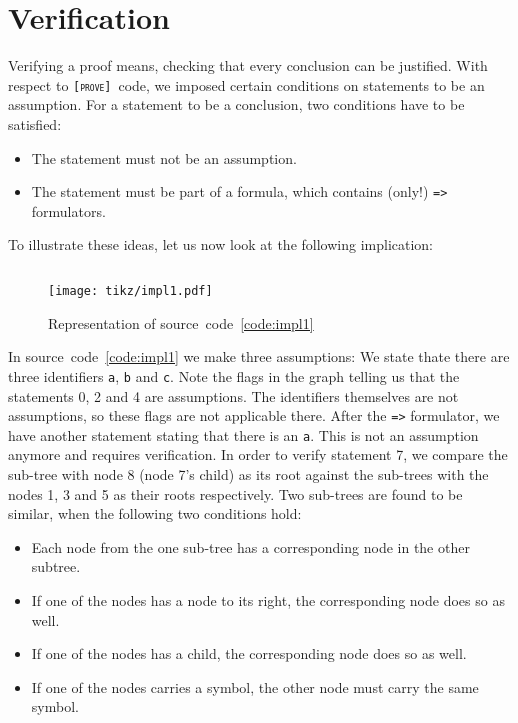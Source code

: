 \documentclass[british]{article}
\newenvironment{code}{\captionsetup{type=listing}}{}
\newcommand\prv{bc}
\newcommand\m[1]{\texttt{#1}}
\newcommand\name{\texttt{\textsc{[prove]}}}
\begin{document}
\pagebreak{}

\section{Verification}

Verifying a proof means, checking that every conclusion can be justified.  With
respect to \name\ code, we imposed certain conditions on statements to be an
assumption. For a statement to be a conclusion, two conditions have to be
satisfied:

\begin{itemize}
	\item
		The statement must not be an assumption.
	\item
		The statement must be part of a formula, which contains (only!) \m{=>}
		formulators. 
\end{itemize}

To illustrate these ideas, let us now look at the following implication:

\begin{code}
\label{code:impl1}
\inputminted[linenos]{\prv}{examples/impl1.prove}
\end{code}

\begin{figure}[!h]
\caption{Representation of source~code~\ref{code:impl1}}\label{fig:impl1}
\centering
\texttt{[image: tikz/impl1.pdf]}
\end{figure}

In source~code~\ref{code:impl1} we make three assumptions: We state thate there
are three identifiers \m{a}, \m{b} and \m{c}. Note the flags in the graph
telling us that the statements 0, 2 and 4 are assumptions. The identifiers
themselves are not assumptions, so these flags are not applicable there. After
the \m{=>} formulator, we have another statement stating that there is an \m{a}.
This is not an assumption anymore and requires verification. In order to verify
statement 7, we compare the sub-tree with node 8 (node 7's child) as its root
against the sub-trees with the nodes 1, 3 and 5 as their roots respectively. Two
sub-trees are found to be similar, when the following two conditions hold:

\begin{itemize}
	\item 
		Each node from the one sub-tree has a corresponding node in the other
		subtree.
	\item
		If one of the nodes has a node to its right, the corresponding node does
		so as well.
	\item
		If one of the nodes has a child, the corresponding node does so as well.
	\item
		If one of the nodes carries a symbol, the other node must carry the same
		symbol.
\end{itemize}
\end{document}
